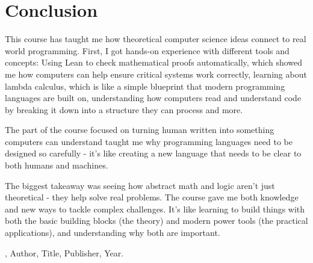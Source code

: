 \documentclass{article}
\theoremstyle{theorem}
\theoremstyle{definition}
\theoremstyle{remark}
\begin{document}
\section{Conclusion}\label{conclusion}


This course has taught me how theoretical computer science ideas connect to real world programming.
First, I got hands-on experience with different tools and concepts:
Using Lean to check mathematical proofs automatically, which showed me how computers can help ensure critical systems work correctly,
learning about lambda calculus, which is like a simple blueprint that modern programming languages are built on, 
understanding how computers read and understand code by breaking it down into a structure they can process and more. 

The part of the course focused on turning human written into something computers can understand taught me why programming languages 
need to be designed so carefully - it's like creating a new language that needs to be clear to both humans and machines.

The biggest takeaway was seeing how abstract math and logic aren't just theoretical - they help solve real problems. 
The course gave me both knowledge and new ways to tackle complex challenges. It's like learning to build things with both the basic 
building blocks (the theory) and modern power tools (the practical applications), and understanding why both are important.


\begin{thebibliography}{99}
\bibitem[BLA], Author, Title, Publisher, Year.
\end{thebibliography}
\end{document}
